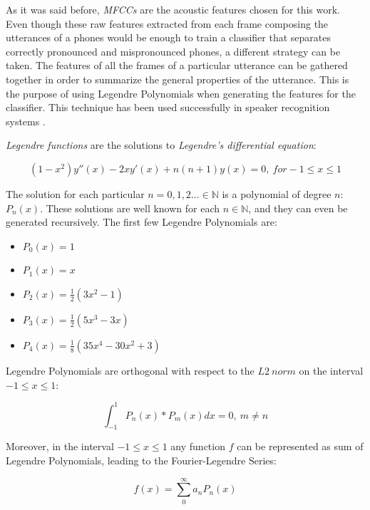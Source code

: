 As it was said before, \textit{MFCCs} are the acoustic features chosen for this work.
Even though these raw features extracted from each frame composing the utterances of a phones
would be enough to train a classifier that separates correctly
pronounced and mispronounced phones, a different strategy can be taken. The features of all the
frames of a particular utterance can be gathered together in order to summarize the
general properties of the utterance. This is the purpose of using Legendre Polynomials when
generating the features for the classifier. This technique has been used successfully
in speaker recognition systems \cite{legendre}.

\textit{Legendre functions} are the solutions to \textit{Legendre's differential equation}:

\begin{equation}
(1-x^{2})y''(x)-2xy'(x)+n(n+1)y(x)=0, \ for -1 \leq x \leq 1
\end{equation}

The solution for each particular $n={0, 1, 2 \dotsc} \in \mathbb{N}$ is a polynomial of degree
$n$: $P_{n}(x)$. These solutions are well known for each $n \in \mathbb{N}$, and they can even
be generated recursively. The first few Legendre Polynomials are:

\begin{itemize}
  \label{itemize:legendreTerms}
  \item[] $P_{0}(x) = 1$
  \item[] $P_{1}(x) = x$
  \item[] $P_{2}(x) = \frac{1}{2}(3x^{2} - 1)$
  \item[] $P_{3}(x) = \frac{1}{2}(5x^{3} - 3x)$
  \item[] $P_{4}(x) = \frac{1}{8}(35x^{4} - 30x^{2} + 3)$
\end{itemize}

Legendre Polynomials are orthogonal with respect to the $L2 \ norm$ on the interval \mbox{$-1 \leq x \leq 1$}:

\begin{equation}
\int_{-1}^{1} P_{n}(x)*P_{m}(x)dx = 0, \ m \neq n
\end{equation}

Moreover, in the interval \mbox{$-1 \leq x \leq 1$} any function $f$ can be represented as sum of
Legendre Polynomials, leading to the Fourier-Legendre Series:

\begin{equation}
f(x) = \sum_{0}^{\infty}a_{n}P_{n}(x)
\end{equation}

